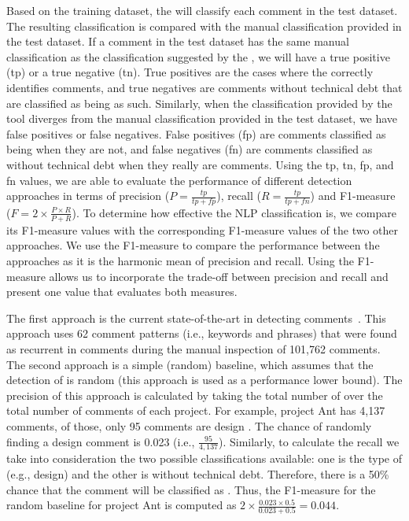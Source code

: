 Based on the training dataset, the  will classify each comment in the test dataset. The resulting classification is compared with the manual classification provided in the test dataset. If a comment in the test dataset has the same manual classification as the classification suggested by the , we will have a true positive (tp) or a true negative (tn). True positives are the cases where the  correctly identifies \SATD comments, and true negatives are comments without technical debt that are classified as being as such. Similarly, when the classification provided by the tool diverges from the manual classification provided in the test dataset, we have false positives or false negatives. False positives (fp) are comments classified as being \SATD when they are not, and false negatives (fn) are comments classified as without technical debt when they really are \SATD comments. Using the tp, tn, fp, and fn values, we are able to evaluate the performance of different detection approaches in terms of precision ($P=\frac{tp}{tp + fp}$), recall ($R=\frac{tp}{tp + fn}$) and F1-measure ($F=2 \times \frac{P \times R}{P + R}$). To determine how effective the NLP classification is, we compare its F1-measure values with the corresponding F1-measure values of the two other approaches. We use the F1-measure to compare the performance between the approaches as it is the harmonic mean of precision and recall. Using the F1-measure allows us to incorporate the trade-off between precision and recall and present one value that evaluates both measures.

The first approach is the current state-of-the-art in detecting \SATD comments~\cite{Potdar2014ICSME}. This approach uses 62 comment patterns (i.e., keywords and phrases) that were found as recurrent in \SATD comments during the manual inspection of 101,762 comments. The second approach is a simple (random) baseline, which assumes that the detection of \SATD is random (this approach is used as a performance lower bound). The precision of this approach is calculated by taking the total number of \SATD over the total number of comments of each project. For example, project Ant has 4,137 comments, of those, only 95 comments are design \SATD. The chance of randomly finding a design \SATD comment is 0.023 (i.e., $\frac{95}{4,137}$). Similarly, to calculate the recall we take into consideration the two possible classifications available: one is the type of \SATD (e.g., design) and the other is without technical debt. Therefore, there is a 50\% chance that the comment will be classified as \SATD. Thus, the F1-measure for the random baseline for project Ant is computed as $2 \times \frac{0.023 \times 0.5}{0.023 + 0.5} = 0.044$.

